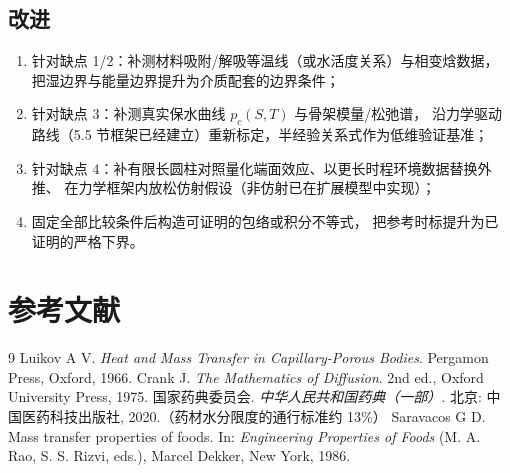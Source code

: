 \documentclass[12pt,a4paper]{ctexart}
\numberwithin{equation}{section}
\begin{document}
\subsection{改进}
\begin{enumerate}
  \item 针对缺点 1/2：补测材料吸附/解吸等温线（或水活度关系）与相变焓数据，
        把湿边界与能量边界提升为介质配套的边界条件；
  \item 针对缺点 3：补测真实保水曲线 $p_c(S,T)$ 与骨架模量/松弛谱，
        沿力学驱动路线（5.5 节框架已经建立）重新标定，半经验关系式作为低维验证基准；
  \item 针对缺点 4：补有限长圆柱对照量化端面效应、以更长时程环境数据替换外推、
        在力学框架内放松仿射假设（非仿射已在扩展模型中实现）；
  \item 固定全部比较条件后构造可证明的包络或积分不等式，
        把参考时标提升为已证明的严格下界。
\end{enumerate}

\section*{参考文献}
\begingroup
\renewcommand{\section}[2]{}%
\begin{thebibliography}{9}
 Luikov A V. \emph{Heat and Mass Transfer in Capillary-Porous Bodies}.
Pergamon Press, Oxford, 1966.
 Crank J. \emph{The Mathematics of Diffusion}. 2nd ed.,
Oxford University Press, 1975.
 国家药典委员会. \emph{中华人民共和国药典（一部）}.
北京: 中国医药科技出版社, 2020.（药材水分限度的通行标准约 13\%）
 Saravacos G D. Mass transfer properties of foods. In:
\emph{Engineering Properties of Foods} (M. A. Rao, S. S. Rizvi, eds.),
Marcel Dekker, New York, 1986.
\end{thebibliography}
\endgroup

\appendix
\end{document}
